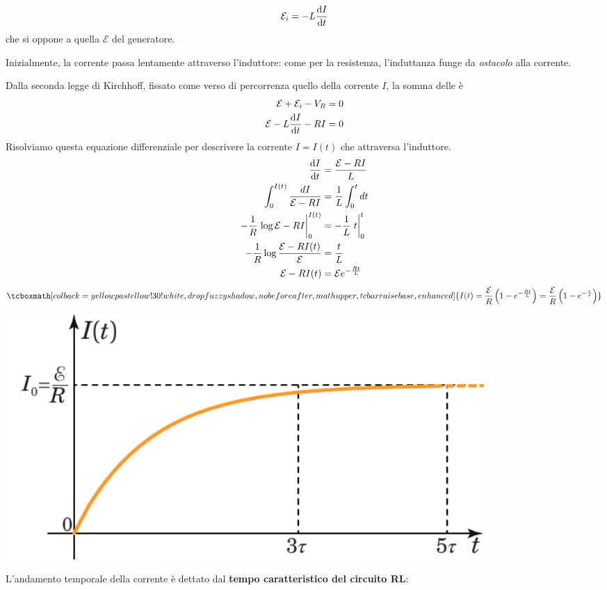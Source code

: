 \begin{equation*}
	\mathcal{E}_i=-L\dv{I}{t}
\end{equation*}
che si oppone a quella $\mathcal{E}$ del generatore.
\begin{observe}
	Inizialmente, la corrente passa lentamente attraverso l'induttore: come per la resistenza, l'induttanza funge da \textit{ostacolo} alla corrente.
\end{observe}
Dalla seconda legge di Kirchhoff, fissato come verso di percorrenza quello della corrente $I$, la somma delle \ddp è
\begin{align*}
	\mathcal{E}+\mathcal{E}_i-V_R=0\\
	\mathcal{E}-L\dv{I}{t}-RI=0
\end{align*}
Risolviamo questa equazione differenziale per descrivere la corrente $I=I(t)$ che attraversa l'induttore.
\begin{align*}
	\dv{I}{t}&=\frac{\mathcal{E}-RI}{L}\\ \int_{0}^{I(t)}\frac{dI}{\mathcal{E}-RI}&=\frac{1}{L}\int_{0}^{t}dt\\
	-\frac{1}{R}\eval{\log{\mathcal{E}-RI}}_{0}^{I(t)}&=-\frac{1}{L}\eval{t}_{0}^{t}\\
	-\frac{1}{R}\log{\frac{\mathcal{E}-RI(t)}{\mathcal{E}}}&=\frac{t}{L}\\
	\mathcal{E}-RI(t)&=\mathcal{E}e^{-\frac{Rt}{L}}
\end{align*}
\begin{equation}
		\tcboxmath[colback=yellowpastellow!30!white,drop fuzzy shadow, nobeforeafter, math upper, tcbox raise base, enhanced]{I(t)=\frac{\mathcal{E}}{R}\left(1-e^{-\frac{Rt}{L}}\right)=\frac{\mathcal{E}}{R}\left(1-e^{-\frac{t}{\tau}}\right)}
\end{equation}
\begin{center}
\includegraphics[width=0.8\textwidth]{images/chp10/chp10induttoregraf1.pdf}
\end{center}
L'andamento temporale della corrente è dettato dal \textbf{tempo caratteristico del circuito RL}:
